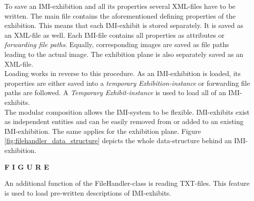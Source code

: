 To save an \ac{IMI}-exhibition and all its properties several XML-files have to be written. The main file contains the aforementioned defining properties of the exhibition. This means that each \ac{IMI}-exhibit is stored separately. It is saved as an XML-file as well. Each \ac{IMI}-file contains all properties as attributes or \textit{forwarding file paths}. Equally, corresponding images are saved as file paths leading to the actual image. The exhibition plane is also separately saved as an XML-file. 
\\
Loading works in reverse to this procedure. As an \ac{IMI}-exhibition is loaded, its properties are either saved into a \textit{temporary Exhibition-instance} or forwarding file paths are followed. A \textit{Temporary Exhibit-instance} is used to load all of an \ac{IMI}-exhibits.
\\
The modular composition allows the \ac{IMI}-system to be flexible. \ac{IMI}-exhibits exist as independent entities and can be easily removed from or added to an existing \ac{IMI}-exhibition. The same applies for the exhibition plane. Figure \ref{fig:filehandler_data_structure} depicts the whole data-structure behind an \ac{IMI}-exhibition.

\textbf{F I G U R E}

An additional function of the FileHandler-class is reading TXT-files. This feature is used to load pre-written descriptions of \ac{IMI}-exhibits.


